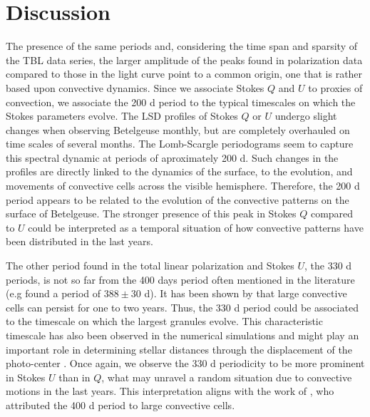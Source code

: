 \documentclass{aa}
\begin{document}
\section{Discussion}
\label{section 4}
The presence of the same 
periods and, considering the time span and sparsity of the TBL data series, the larger amplitude of the peaks found in
polarization data compared to those in the light curve point to a common origin, one that is rather based upon convective dynamics. Since we associate Stokes $Q$ and $U$ to proxies of convection, we associate the 200 d period to the typical timescales on which the Stokes parameters evolve. 
The LSD profiles of Stokes $Q$ or $U$ undergo slight changes when observing Betelgeuse monthly, but are completely overhauled 
on time scales of several months. The Lomb-Scargle periodograms seem to capture this spectral dynamic at periods of aproximately 200 d. Such changes in the profiles are directly linked to the dynamics of the surface,  to  the evolution, and movements 
of convective cells across the visible hemisphere. Therefore, the 200 d period appears to be related to the evolution of the convective patterns 
on the surface of Betelgeuse.  The stronger presence of this peak in Stokes $Q$ compared to $U$ could be interpreted as a temporal situation of how convective patterns have been distributed in the
last years.\

The other period found in the total linear polarization and Stokes $U$, the 330 d periods, is not so far from the 400 days period often mentioned in the literature (e.g \cite{kiss_variability_2006} found a period of $388 \pm 30$ d). It has been shown by \cite{lopez_ariste_convective_2018} that large convective cells can persist for one to two years. Thus, the 330 d period could be associated to the timescale on which the largest granules evolve. This characteristic timescale has also been observed in the numerical simulations and might play an important role in determining stellar distances through the displacement of the photo-center \citep{chiavassa_probing_2022}. Once again, we observe the 330 d periodicity to be more prominent in Stokes $U$ than in $Q$, what may unravel a random situation due to convective motions in the last years. This interpretation aligns with the work of \cite{gray_mass_2008}, who attributed the 400 d period to large convective cells.  \
\end{document}

